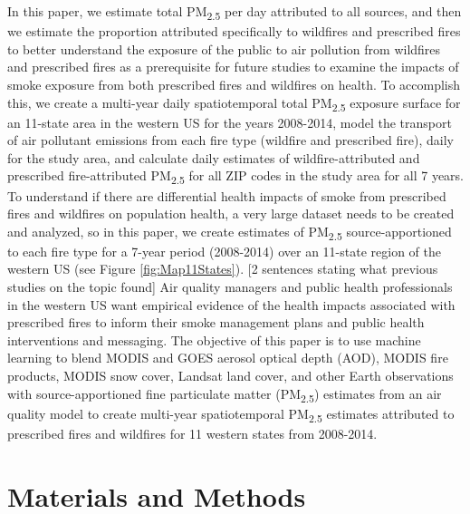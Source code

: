 \documentclass[authoryear]{elsarticle}
\begin{document}
In this paper, we estimate total PM\textsubscript{2.5} per day attributed to all sources, and then we estimate the proportion attributed specifically to wildfires and prescribed fires to better understand the exposure of the public to air pollution from wildfires and prescribed fires as a prerequisite for future studies to examine the impacts of smoke exposure from both prescribed fires and wildfires on health.
To accomplish this, we create a multi-year daily spatiotemporal total PM\textsubscript{2.5} exposure surface for an 11-state area in the western US for the years 2008-2014, model the transport of air pollutant emissions from each fire type (wildfire and prescribed fire), daily for the study area, and calculate daily estimates of wildfire-attributed and prescribed fire-attributed PM\textsubscript{2.5} for all ZIP codes in the study area for all 7 years.
To understand if there are differential health impacts of smoke from prescribed fires and wildfires on population health, a very large dataset needs to be created and analyzed, so in this paper, we
create estimates of PM\textsubscript{2.5} source-apportioned to each fire type for a 7-year period (2008-2014) over an 11-state region of the western US (see Figure \ref{fig:Map11States}). 
[2 sentences stating what previous studies on the topic found]
Air quality managers and public health professionals in the western US want empirical evidence of the health impacts associated with prescribed fires to inform their smoke management plans and public health interventions and messaging. 
The objective of this paper is to use machine learning to blend MODIS and GOES aerosol optical depth (AOD), MODIS fire products, MODIS snow cover, Landsat land cover, and other Earth observations with source-apportioned fine particulate matter (PM\textsubscript{2.5}) estimates from an air quality model to create multi-year spatiotemporal PM\textsubscript{2.5} estimates attributed to prescribed fires and wildfires for 11 western states from 2008-2014.

\section{Materials and Methods}
\end{document}
